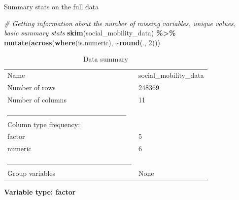 \documentclass[
]{article}
\newenvironment{Shaded}{\begin{snugshade}}{\end{snugshade}}
\newcommand{\CommentTok}[1]{\textcolor[rgb]{0.56,0.35,0.01}{\textit{#1}}}
\newcommand{\DecValTok}[1]{\textcolor[rgb]{0.00,0.00,0.81}{#1}}
\newcommand{\FunctionTok}[1]{\textcolor[rgb]{0.13,0.29,0.53}{\textbf{#1}}}
\newcommand{\NormalTok}[1]{#1}
\newcommand{\SpecialCharTok}[1]{\textcolor[rgb]{0.81,0.36,0.00}{\textbf{#1}}}
\begin{document}
Summary stats on the full data

\begin{Shaded}
\begin{Highlighting}[]
\CommentTok{\# Getting information about the number of missing variables, unique values, basic summary stats}
\FunctionTok{skim}\NormalTok{(social\_mobility\_data) }\SpecialCharTok{\%\textgreater{}\%}
  \FunctionTok{mutate}\NormalTok{(}\FunctionTok{across}\NormalTok{(}\FunctionTok{where}\NormalTok{(is.numeric), }\SpecialCharTok{\textasciitilde{}}\FunctionTok{round}\NormalTok{(., }\DecValTok{2}\NormalTok{)))}
\end{Highlighting}
\end{Shaded}

\begin{longtable}[]{@{}ll@{}}
\caption{Data summary}\tabularnewline
\toprule\noalign{}
\endfirsthead
\endhead
\bottomrule\noalign{}
\endlastfoot
Name & social\_mobility\_data \\
Number of rows & 248369 \\
Number of columns & 11 \\
\_\_\_\_\_\_\_\_\_\_\_\_\_\_\_\_\_\_\_\_\_\_\_ & \\
Column type frequency: & \\
factor & 5 \\
numeric & 6 \\
\_\_\_\_\_\_\_\_\_\_\_\_\_\_\_\_\_\_\_\_\_\_\_\_ & \\
Group variables & None \\
\end{longtable}

\textbf{Variable type: factor}
\end{document}
